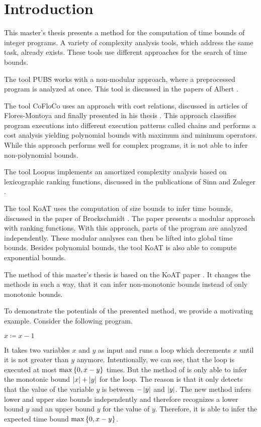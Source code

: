 \section{Introduction}

This master's thesis presents a method for the computation of time bounds of integer programs.
A variety of complexity analysis tools, which address the same task, already exists.
These tools use different approaches for the search of time bounds.

The tool PUBS works with a non-modular approach, where a preprocessed program is analyzed at once.
This tool is discussed in the papers of Albert \cite{pubs1, pubs2}.

The tool CoFloCo uses an approach with cost relations, discussed in articles of Flores-Montoya \cite{cofloco1, cofloco2, cofloco4} and finally presented in his thesis \cite{cofloco3}.
This approach classifies program executions into different execution patterns called chains and performs a cost analysis yielding polynomial bounds with maximum and minimum operators. 
While this approach performs well for complex programs, it is not able to infer non-polynomial bounds.

The tool Loopus implements an amortized complexity analysis based on lexicographic ranking functions, discussed in the publications of Sinn and Zuleger \cite{loopus1, loopus2}.

The tool KoAT uses the computation of size bounds to infer time bounds, discussed in the paper of Brockschmidt \cite{koat}.
The paper presents a modular approach with ranking functions.
With this approach, parts of the program are analyzed independently.
These modular analyses can then be lifted into global time bounds.
Besides polynomial bounds, the tool KoAT \cite{koat} is also able to compute exponential bounds.

The method of this master's thesis is based on the KoAT paper \cite{koat}.
It changes the methods in such a way, that it can infer non-monotonic bounds instead of only monotonic bounds.

To demonstrate the potentials of the presented method, we provide a motivating example.
Consider the following program.

\begin{algorithmic}
    \State $x \coloneqq x - 1$
  \EndWhile
\end{algorithmic}

It takes two variables $x$ and $y$ as input and runs a loop which decrements $x$ until it is not greater than $y$ anymore.
Intentionally, we can see, that the loop is executed at most $\max \left\lbrace 0, x-y \right\rbrace$ times.
But the method of \cite{koat} is only able to infer the monotonic bound $\left|x\right|+\left|y\right|$ for the loop.
The reason is that it only detects that the value of the variable $y$ is between $-\left|y\right|$ and $\left|y\right|$.
The new method infers lower and upper size bounds independently and therefore recognizes a lower bound $y$ and an upper bound $y$ for the value of $y$.
Therefore, it is able to infer the expected time bound $\max \left\lbrace 0, x-y \right\rbrace$.

